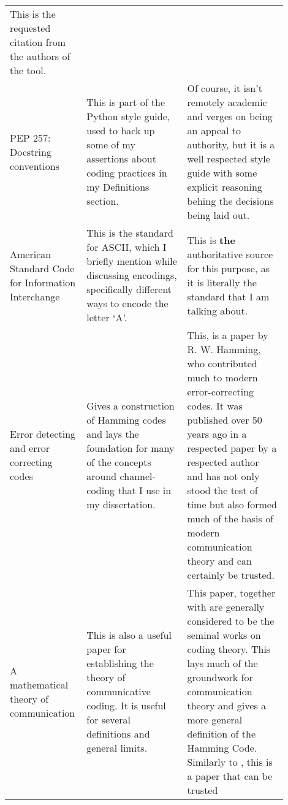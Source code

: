 \documentclass[a4paper,11pt]{article}
\begin{document}
\begin{center}
{\begin{longtable}{p{0.2\linewidth} p{0.35\linewidth} p{0.35\linewidth}}
    This is the requested citation from the authors of the tool.

    \\

    PEP 257: Docstring conventions \cite{PEPDocstrings2014Goodger} &

    This is part of the Python style guide, used to back up some of my
    assertions about coding practices in my Definitions section. &

    Of course, it isn't remotely academic and verges on being an appeal to
    authority, but it is a well respected style guide with some explicit
    reasoning behing the decisions being laid out.

    \\

    American Standard Code for Information Interchange \cite{ASCII1963ASA} &

    This is the standard for ASCII, which I briefly mention while discussing
    encodings, specifically different ways to encode the letter `A'. &

    This is \textbf{the} authoritative source for this purpose, as it is
    literally the standard that I am talking about.  \\

    Error detecting and error correcting codes \cite{Codes1950Hamming} &

    Gives a construction of Hamming codes and lays the foundation for many of
    the concepts around channel-coding that I use in my dissertation. &

    This, is a paper by R. W. Hamming, who contributed much to modern
    error-correcting codes. It was published over 50 years ago in a respected
    paper by a respected author and has not only stood the test of time but
    also formed much of the basis of modern communication theory and can
    certainly be trusted.  \\

    A mathematical theory of communication \cite{Communication1948Shannon} &

    This is also a useful paper for establishing the theory of communicative
    coding. It is useful for several definitions and general limits. &

    This paper, together with \cite{Codes1950Hamming} are generally
    considered to be the seminal works on coding theory. This lays much of the
    groundwork for communication theory and gives a more general definition of
    the Hamming Code. Similarly to \cite{Codes1950Hamming}, this is a paper
    that can be trusted \\


\end{longtable}}
\end{center}
\end{document}
